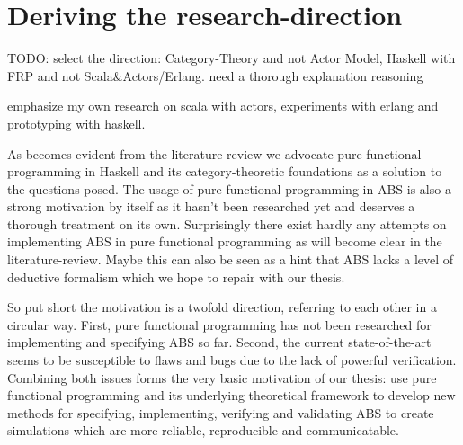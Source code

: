 \section{Deriving the research-direction}
TODO: select the direction: Category-Theory and not Actor Model, Haskell with FRP and not Scala\&Actors/Erlang. need a thorough explanation reasoning

emphasize my own research on scala with actors, experiments with erlang and prototyping with haskell.

As becomes evident from the literature-review we advocate pure functional programming in Haskell and its category-theoretic foundations as a solution to the questions posed. The usage of pure functional programming in ABS is also a strong motivation by itself as it hasn't been researched yet and deserves a thorough treatment on its own. Surprisingly there exist hardly any attempts on implementing ABS in pure functional programming as will become clear in the literature-review. Maybe this can also be seen as a hint that ABS lacks a level of deductive formalism which we hope to repair with our thesis. 

So put short the motivation is a twofold direction, referring to each other in a circular way. First, pure functional programming has not been researched for implementing and specifying ABS so far. Second,  the current state-of-the-art seems to be susceptible to flaws and bugs due to the lack of powerful verification. Combining both issues forms the very basic motivation of our thesis: use pure functional programming and its underlying theoretical framework to develop new methods for specifying, implementing, verifying and validating ABS to create simulations which are more reliable, reproducible and communicatable.
